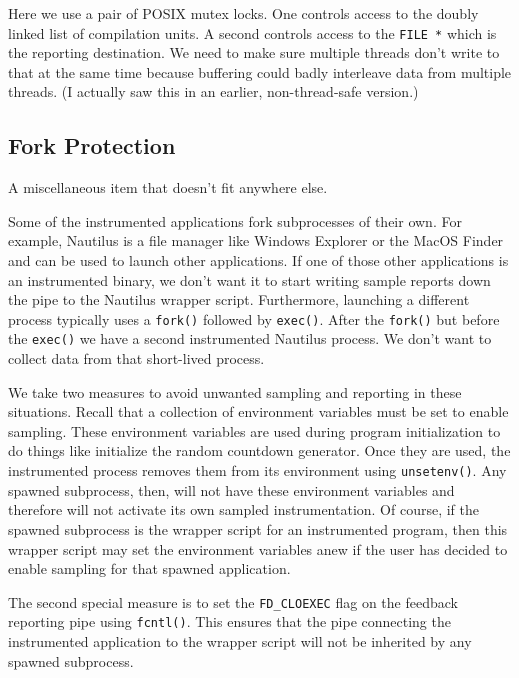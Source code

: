 \documentclass[times,10pt,twocolumn]{article}
\begin{document}
Here we use a pair of POSIX mutex locks.  One controls access to the
doubly linked list of compilation units.  A second controls access to
the \texttt{FILE *} which is the reporting destination.  We need to
make sure multiple threads don't write to that at the same time
because buffering could badly interleave data from multiple threads.
(I actually saw this in an earlier, non-thread-safe version.)

\subsection{Fork Protection}

A miscellaneous item that doesn't fit anywhere else.

Some of the instrumented applications fork subprocesses of their own.
For example, Nautilus is a file manager like Windows Explorer or the
MacOS Finder and can be used to launch other applications.  If one of
those other applications is an instrumented binary, we don't want it
to start writing sample reports down the pipe to the Nautilus wrapper
script.  Furthermore, launching a different process typically uses a
\texttt{fork()} followed by \texttt{exec()}.  After the
\texttt{fork()} but before the \texttt{exec()} we have a second
instrumented Nautilus process.  We don't want to collect data from
that short-lived process.

We take two measures to avoid unwanted sampling and reporting in these
situations.  Recall that a collection of environment variables must be
set to enable sampling.  These environment variables are used during
program initialization to do things like initialize the random
countdown generator.  Once they are used, the instrumented process
removes them from its environment using \texttt{unsetenv()}.  Any
spawned subprocess, then, will not have these environment variables
and therefore will not activate its own sampled instrumentation.  Of
course, if the spawned subprocess is the wrapper script for an
instrumented program, then this wrapper script may set the environment
variables anew if the user has decided to enable sampling for that
spawned application.

The second special measure is to set the \texttt{FD\_CLOEXEC} flag on
the feedback reporting pipe using \texttt{fcntl()}.  This ensures that
the pipe connecting the instrumented application to the wrapper script
will not be inherited by any spawned subprocess.
\end{document}
